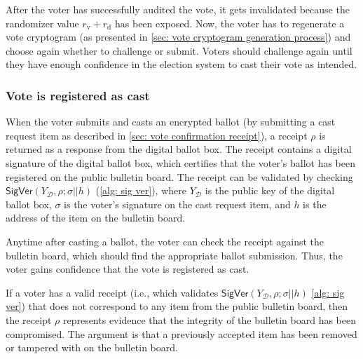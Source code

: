 After the voter has successfully audited the vote, it gets invalidated because the randomizer value $r_\mathrm{v} + r_\mathrm{d}$ has been exposed. Now, the voter has to regenerate a vote cryptogram (as presented in \cref{sec: vote cryptogram generation process}) and choose again whether to challenge or submit. Voters should challenge again until they have enough confidence in the election system to cast their vote as intended.

 
\subsubsection{Vote is registered as cast} \label{sec: vote is registered as cast}
When the voter submits and casts an encrypted ballot (by submitting a cast request item as described in \cref{sec: vote confirmation receipt}), a receipt $\rho$ is returned as a response from the digital ballot box. The receipt contains a digital signature of the digital ballot box, which certifies that the voter's ballot has been registered on the public bulletin board. The receipt can be validated by checking $\mathsf{SigVer} (Y_\mathcal{D}, \rho; \sigma || h)$ (\cref{alg: sig ver}), where $Y_\mathcal{D}$ is the public key of the digital ballot box, $\sigma$ is the voter's signature on the cast request item, and $h$ is the address of the item on the bulletin board.

Anytime after casting a ballot, the voter can check the receipt against the bulletin board, which should find the appropriate ballot submission. Thus, the voter gains confidence that the vote is registered as cast.

If a voter has a valid receipt (i.e., which validates $\mathsf{SigVer} (Y_\mathcal{D}, \rho; \sigma || h)$ \cref{alg: sig ver}) that does not correspond to any item from the public bulletin board, then the receipt $\rho$ represents evidence that the integrity of the bulletin board has been compromised. The argument is that a previously accepted item has been removed or tampered with on the bulletin board.
